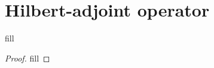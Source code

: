 \section{Hilbert-adjoint operator}

\begin{exercise}{1}
fill
\end{exercise}
\begin{proof}
fill
\end{proof}